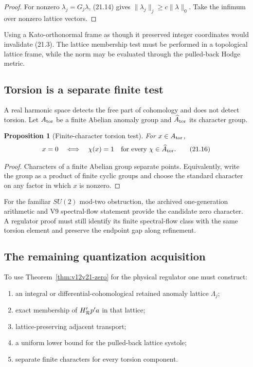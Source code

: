 \documentclass[11pt]{article}
\newtheorem{proposition}[theorem]{Proposition}
\theoremstyle{remark}
\begin{document}
\begin{proof}
For nonzero \(\lambda_j=G_j\lambda\),
(21.14) gives
\(\|\lambda_j\|_j\ge c\|\lambda\|_0\).
Take the infimum over nonzero lattice vectors.
\end{proof}

Using a Kato-orthonormal frame as though it preserved integer
coordinates would invalidate (21.3).  The lattice membership test
must be performed in a topological lattice frame, while the norm may
be evaluated through the pulled-back Hodge metric.

\subsection{Torsion is a separate finite test}

A real harmonic space detects the free part of cohomology and does
not detect torsion.  Let \(A_{\rm tor}\) be a finite Abelian anomaly
group and \(\widehat A_{\rm tor}\) its character group.

\begin{proposition}[Finite-character torsion test]
\label{prop:v12v21-torsion}
For \(x\in A_{\rm tor}\),
\[
 x=0
 \quad\Longleftrightarrow\quad
 \chi(x)=1\quad\hbox{for every }\chi\in\widehat A_{\rm tor}. \tag{21.16}
\]
\end{proposition}

\begin{proof}
Characters of a finite Abelian group separate points.  Equivalently,
write the group as a product of finite cyclic groups and choose the
standard character on any factor in which \(x\) is nonzero.
\end{proof}

For the familiar \(SU(2)\) mod-two obstruction, the archived
one-generation arithmetic and V9 spectral-flow statement provide the
candidate zero character.  A regulator proof must still identify its
finite spectral-flow class with the same torsion element and preserve
the endpoint gap along refinement.

\subsection{The remaining quantization acquisition}

To use Theorem~\ref{thm:v12v21-zero} for the physical regulator one
must construct:

\begin{enumerate}
\item an integral or differential-cohomological retained anomaly
      lattice \(\Lambda_j\);
\item exact membership of \(H_{\cal R}'p'a\) in that lattice;
\item lattice-preserving adjacent transport;
\item a uniform lower bound for the pulled-back lattice systole;
\item separate finite characters for every torsion component.
\end{enumerate}
\end{document}
